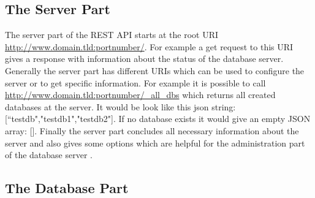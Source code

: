 \subsection{The Server Part}
 
The server part of the REST API starts at the root URI \url{http://www.domain.tld:portnumber/}. For example a get request to this URI gives a response with information about the status of the database server. 
Generally the server part has different URIs which can be used to configure the server or to get specific information. For example it is possible to call \url{http://www.domain.tld:portnumber/_all_dbs} which returns all created databases at the server.
It would be look like this json string: [“testdb","testdb1","testdb2"]. 
If no database exists it would give an empty JSON array: []. 
Finally the server part concludes all necessary information about the server and also gives some options which are helpful for the administration part of the database server \cite{CouchDBRestServer}.

\subsection{The Database Part}
\label{subsec:TheDatabasePart-1}

